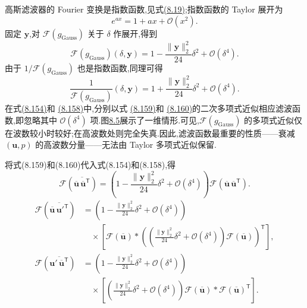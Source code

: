 \begin{note}
\label{note:les-taylor-polynomial-approximation}
高斯滤波器的 Fourier 变换是指数函数,见式\hyperref[eq:gaussian-filter-fourier]{(8.19)};指数函数的 Taylor 展开为
\[
 e^{ax}=1+ax+\mathcal{O}(x^2).
\]
固定 $\bm{y}$,对 $\mathcal{F}(g_{\mathrm{Gauss}})$ 关于 $\delta$ 作展开,得到
\begin{equation}\label{eq:les-taylor-filter-expansion}
 \mathcal{F}(g_{\mathrm{Gauss}})(\delta,\bm{y})
 =1-\frac{\|\bm{y}\|_2^2}{24}\delta^2
   +\mathcal{O}(\delta^4).
\end{equation}
由于 $1/\mathcal{F}(g_{\mathrm{Gauss}})$ 也是指数函数,同理可得
\begin{equation}\label{eq:les-taylor-inverse-filter-expansion}
 \frac{1}{\mathcal{F}(g_{\mathrm{Gauss}})}(\delta,\bm{y})
 =1+\frac{\|\bm{y}\|_2^2}{24}\delta^2
   +\mathcal{O}(\delta^4).
\end{equation}
在式\hyperref[eq:les-wave-large-scale-fourier]{(8.154)}和
\hyperref[eq:les-wave-cross-terms-filtered]{(8.158)}中,分别以式
\hyperref[eq:les-taylor-filter-expansion]{(8.159)}和
\hyperref[eq:les-taylor-inverse-filter-expansion]{(8.160)}的二次多项式近似相应滤波函数,即忽略其中 $\mathcal{O}(\delta^4)$ 项.图\hyperref[fig:les-taylor-filter-approximation]{8.5}展示了一维情形.可见,$\mathcal{F}(g_{\mathrm{Gauss}})$ 的多项式近似仅在波数较小时较好;在高波数处则完全失真.因此,滤波函数最重要的性质——衰减 $(\bm{u},p)$ 的高波数分量——无法由 Taylor 多项式近似保留.

将式(8.159)和(8.160)代入式(8.154)和(8.158),得
\begin{equation}\label{eq:les-taylor-large-scale-expanded}
\mathcal{F}\!\left(
 \overline{\overline{\bm{u}}\,
 \overline{\bm{u}}^{\mathsf T}}\right)
 =\left(
  1-\frac{\|\bm{y}\|_2^2}{24}\delta^2
  +\mathcal{O}(\delta^4)\right)
  \mathcal{F}\!\left(
   \overline{\bm{u}}\,
   \overline{\bm{u}}^{\mathsf T}\right).
\end{equation}
\begin{equation}\label{eq:les-taylor-cross-terms-expanded}
\begin{aligned}
 \mathcal{F}\!\left(
  \overline{\overline{\bm{u}}\,\bm{u}'^{\mathsf T}}\right)
 &=\left(
   1-\frac{\|\bm{y}\|_2^2}{24}\delta^2
   +\mathcal{O}(\delta^4)\right)\\
 &\quad{}\times
   \left[
    \mathcal{F}(\overline{\bm{u}})
    *\left(
      \left(\frac{\|\bm{y}\|_2^2}{24}\delta^2
       +\mathcal{O}(\delta^4)\right)
      \mathcal{F}(\overline{\bm{u}})\right)^{\mathsf T}
   \right],\\
 \mathcal{F}\!\left(
  \overline{\bm{u}'\,\overline{\bm{u}}^{\mathsf T}}\right)
 &=\left(
   1-\frac{\|\bm{y}\|_2^2}{24}\delta^2
   +\mathcal{O}(\delta^4)\right)\\
 &\quad{}\times
   \left[
    \left(\frac{\|\bm{y}\|_2^2}{24}\delta^2
     +\mathcal{O}(\delta^4)\right)
    \mathcal{F}(\overline{\bm{u}})
    *\mathcal{F}(\overline{\bm{u}})^{\mathsf T}
   \right].
\end{aligned}
\end{equation}
\end{note}
